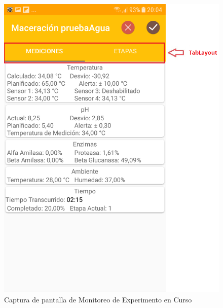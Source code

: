             \begin{figure}[h]
                \centering
                \includegraphics[scale=0.27]{software/ScreenCapture/MeasureFragment.jpg}
                \caption{Captura de pantalla de Monitoreo de Experimento en Curso}
                \label{fig:CapturaMeasureFrag}
            \end{figure}
